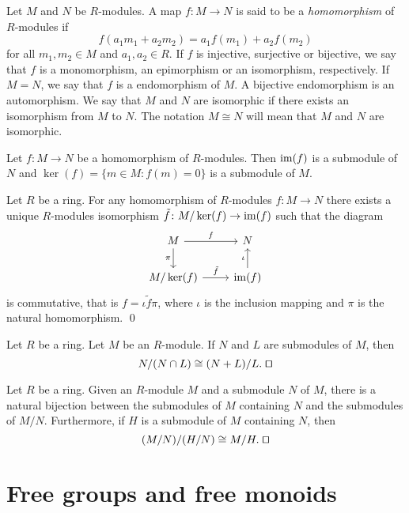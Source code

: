 Let $M$ and $N$ be $R$-modules. A map $f\colon M\rightarrow
N$ is said to be a {\em homomorphism} of $R$-modules if
\[
f(a_1m_1+a_2m_2)=a_1f(m_1)+a_2f(m_2)
\]
for all $m_1,m_2\in M$ and $a_1,a_2\in R$.
If $f$ is injective, surjective or bijective, we say that $f$ is
a monomorphism, an epimorphism or an isomorphism, respectively. If $M=N$, we say that
$f$ is a endomorphism of $M$. A bijective endomorphism is an
automorphism. We say that $M$ and $N$ are isomorphic if there exists 
an isomorphism from $M$ to $N$. The notation
$M\cong N$ will mean that $M$ and $N$ are isomorphic.

Let $f\colon M\rightarrow N$ be a homomorphism of $R$-modules. Then
$\operatorname{im}(f)$ is a submodule
of $N$ and $\ker(f)=\{m\in M:f(m)=0\}$ is a submodule of $M$.

 
\begin{theorem}
Let $R$ be a ring.	For any homomorphism of $R$-modules $f\colon M\rightarrow N$ 
there exists a unique $R$-modules isomorphism $\tilde f\colon M/\ker(f)\rightarrow\operatorname{im}(f)$ such that the diagram
	\[\begin{tikzcd}
		{M} & {N} \\
		{M/\ker(f)} & {\im(f)}
		\arrow["f", from=1-1, to=1-2]
		\arrow["{\pi}"', from=1-1, to=2-1]
		\arrow["{\iota}", from=2-2, to=1-2]
		\arrow["{\tilde f}", from=2-1, to=2-2]
	\end{tikzcd}
	\]
	is commutative, that is $f=\iota\tilde f\pi$, 
 where $\iota$ is the inclusion mapping and $\pi$ is the natural homomorphism. \qed	
\end{theorem} 


\begin{theorem}
Let $R$ be a ring.	Let $M$ be an $R$-module. If $N$ and $L$ are submodules of $M$, then 
	$$N/(N\cap L)\cong (N+L)/L. \; \qed$$  
\end{theorem}

\begin{theorem} Let $R$ be a ring. Given an $R$-module $M$ and a submodule $N$ of $M$, there is a natural bijection between the submodules of $M$ containing $N$ and the submodules of $M/N$. 
Furthermore, if $H$ is a submodule of $M$ containing $N$, then
\[
(M/N)/(H/N)\cong M/H.\; \qed
\]
\end{theorem}

\section{Free groups and free monoids}

